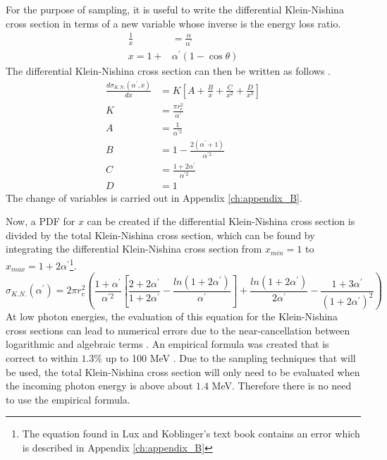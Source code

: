 For the purpose of sampling, it is useful to write the differential 
Klein-Nishina cross section in terms of a new variable whose inverse is the 
energy loss ratio.
\begin{align}
  \frac{1}{x} & = \frac{\alpha}{\alpha^{'}} \\
  x = 1+&\alpha^{'}(1-\cos{\theta})
\end{align}
The differential Klein-Nishina cross section can then be written as follows 
\citep{lux_monte_1991}.
\begin{align}
  \frac{d\sigma_{K.N.}(\alpha^{'},x)}{dx} & = K \left[ A + \frac{B}{x} +
    \frac{C}{x^2} + \frac{D}{x^3} \right] \\
  K & = \frac{\pi r_e^2}{\alpha^{'}} \nonumber \\
  A & = \frac{1}{\alpha^{'2}} \nonumber \\
  B & = 1 - \frac{2(\alpha^{'} + 1)}{\alpha^{'2}} \nonumber \\
  C & = \frac{1 + 2\alpha^{'}}{\alpha^{'2}} \nonumber \\
  D & = 1 \nonumber
\end{align}
The change of variables is carried out in Appendix \ref{ch:appendix_B}.

Now, a PDF for $x$ can be created if the differential Klein-Nishina cross 
section is divided by the total Klein-Nishina cross section, which can be found 
by integrating the differential Klein-Nishina cross section from $x_{min} = 1$ to
$x_{max} = 1 + 2 \alpha^{'}$\footnote{The equation found in Lux and Koblinger's
text book contains an error which is described in Appendix \ref{ch:appendix_B}}.
\begin{equation}
  \sigma_{K.N.}(\alpha^{'}) = 2\pi r_e^2 \left( \frac{1+\alpha^{'}}{\alpha^{'2}}
  \left[\frac{2+2\alpha^{'}}{1+2\alpha^{'}} - 
    \frac{ln(1+2\alpha^{'})}{\alpha^{'}} \right]
  + \frac{ln(1+2\alpha^{'})}{2\alpha^{'}} - 
  \frac{1+3\alpha^{'}}{(1+2\alpha^{'})^2} \right)
\end{equation}
At low photon energies, the evaluation of this equation for the Klein-Nishina 
cross sections can lead to numerical errors due to the near-cancellation between
logarithmic and algebraic terms \citep{lux_monte_1991}. An empirical formula
was created that is correct to within $1.3\%$ up to 100 MeV
\citep{hastings_approximations_1955}. Due to the sampling techniques that will
be used, the total Klein-Nishina cross section will only need to be evaluated
when the incoming photon energy is above about $1.4$ MeV. Therefore there is no 
need to use the empirical formula.

